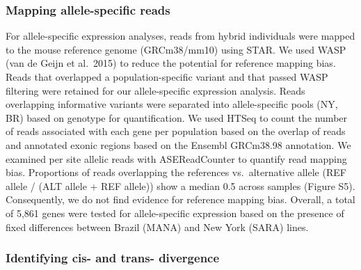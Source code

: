 \documentclass[9pt,twocolumn,twoside,lineno]{pnas-new}
\begin{document}
\hypertarget{mapping-allele-specific-reads}{%
\subsubsection*{Mapping allele-specific
reads}\label{mapping-allele-specific-reads}}

For allele-specific expression analyses, reads from hybrid individuals
were mapped to the mouse reference genome (GRCm38/mm10) using STAR. We
used WASP (van de Geijn et al.~2015) to reduce the potential for
reference mapping bias. Reads that overlapped a population-specific
variant and that passed WASP filtering were retained for our
allele-specific expression analysis. Reads overlapping informative
variants were separated into allele-specific pools (NY, BR) based on
genotype for quantification. We used HTSeq to count the number of reads
associated with each gene per population based on the overlap of reads
and annotated exonic regions based on the Ensembl GRCm38.98 annotation.
We examined per site allelic reads with ASEReadCounter to quantify read
mapping bias. Proportions of reads overlapping the references
vs.~alternative allele (REF allele / (ALT allele + REF allele)) show a
median 0.5 across samples (Figure S5). Consequently, we do not find
evidence for reference mapping bias. Overall, a total of 5,861 genes
were tested for allele-specific expression based on the presence of
fixed differences between Brazil (MANA) and New York (SARA) lines.

\hypertarget{identifying-cis-and-trans-divergene}{%
\subsubsection*{Identifying cis- and trans-
divergence}\label{identifying-cis-and-trans-divergene}}
\end{document}
